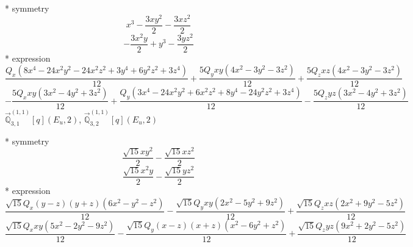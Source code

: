 \documentclass[fleqn,8pt]{jsarticle}
\begin{document}
\noindent\quad ** symmetry
\begin{dmath*}
x^{3} - \frac{3 x y^{2}}{2} - \frac{3 x z^{2}}{2}
\end{dmath*}
\begin{dmath*}
- \frac{3 x^{2} y}{2} + y^{3} - \frac{3 y z^{2}}{2}
\end{dmath*}
\noindent\quad ** expression
\begin{dmath*}
\frac{Q_{x} \left(8 x^{4} - 24 x^{2} y^{2} - 24 x^{2} z^{2} + 3 y^{4} + 6 y^{2} z^{2} + 3 z^{4}\right)}{12} + \frac{5 Q_{y} x y \left(4 x^{2} - 3 y^{2} - 3 z^{2}\right)}{12} + \frac{5 Q_{z} x z \left(4 x^{2} - 3 y^{2} - 3 z^{2}\right)}{12}
\end{dmath*}
\begin{dmath*}
- \frac{5 Q_{x} x y \left(3 x^{2} - 4 y^{2} + 3 z^{2}\right)}{12} + \frac{Q_{y} \left(3 x^{4} - 24 x^{2} y^{2} + 6 x^{2} z^{2} + 8 y^{4} - 24 y^{2} z^{2} + 3 z^{4}\right)}{12} - \frac{5 Q_{z} y z \left(3 x^{2} - 4 y^{2} + 3 z^{2}\right)}{12}
\end{dmath*}
\noindent\quad $\vec{\mathbb{Q}}_{3,1}^{(1,1)}[q](E_{u},2)$, $\vec{\mathbb{Q}}_{3,2}^{(1,1)}[q](E_{u},2)$

\noindent\quad ** symmetry
\begin{dmath*}
\frac{\sqrt{15} x y^{2}}{2} - \frac{\sqrt{15} x z^{2}}{2}
\end{dmath*}
\begin{dmath*}
\frac{\sqrt{15} x^{2} y}{2} - \frac{\sqrt{15} y z^{2}}{2}
\end{dmath*}
\noindent\quad ** expression
\begin{dmath*}
\frac{\sqrt{15} Q_{x} \left(y - z\right) \left(y + z\right) \left(6 x^{2} - y^{2} - z^{2}\right)}{12} - \frac{\sqrt{15} Q_{y} x y \left(2 x^{2} - 5 y^{2} + 9 z^{2}\right)}{12} + \frac{\sqrt{15} Q_{z} x z \left(2 x^{2} + 9 y^{2} - 5 z^{2}\right)}{12}
\end{dmath*}
\begin{dmath*}
\frac{\sqrt{15} Q_{x} x y \left(5 x^{2} - 2 y^{2} - 9 z^{2}\right)}{12} - \frac{\sqrt{15} Q_{y} \left(x - z\right) \left(x + z\right) \left(x^{2} - 6 y^{2} + z^{2}\right)}{12} + \frac{\sqrt{15} Q_{z} y z \left(9 x^{2} + 2 y^{2} - 5 z^{2}\right)}{12}
\end{dmath*}
\end{document}
